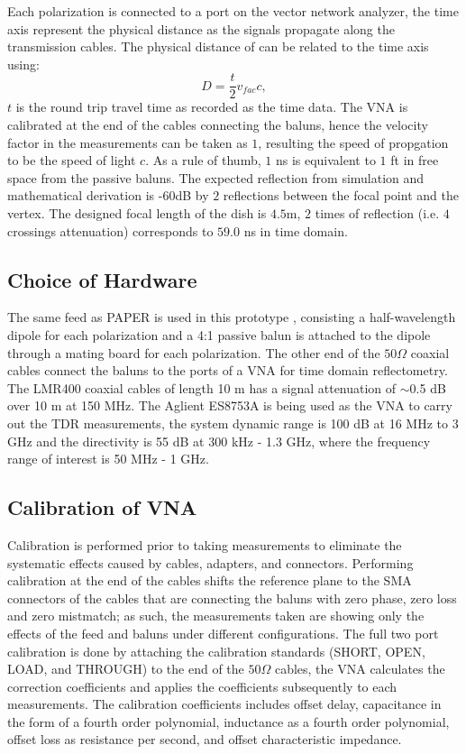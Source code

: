 \documentclass[preprint]{aastex}  %
\begin{document}
Each polarization is connected to a port on the vector network analyzer, the time axis represent the physical distance as the signals propagate along the transmission cables. The physical distance of can be related to the time axis using:
\begin{equation}
D = \frac{t}{2}v_{fac}c,
\end{equation}
$t$ is the round trip travel time as recorded as the time data.
The VNA is calibrated at the end of the cables connecting the baluns, hence the velocity factor in the measurements can be taken as $1$, resulting the speed of propgation to be the speed of light $c$. As a rule of thumb,  $1$ ns is equivalent to $1$ ft in free space from the passive baluns. The expected reflection from simulation and mathematical derivation is -$60$dB by $2$ reflections between the focal point and the vertex. The designed focal length of the dish is $4.5$m, $2$ times of reflection (i.e. $4$ crossings attenuation) corresponds to $59.0$ ns in time domain.
\subsection{Choice of Hardware}
The same feed as PAPER is used in this prototype , consisting a half-wavelength dipole for each polarization and a 4:1 passive balun is attached to the dipole through a mating board for each polarization. The other end of the $50\Omega$ coaxial cables connect the baluns to the ports of a VNA for time domain reflectometry. The LMR400 coaxial cables of length 10 m has a signal attenuation of $\sim$0.5 dB over 10 m at 150 MHz. The Aglient ES8753A is being used as the VNA to carry out the TDR measurements, the system dynamic range is 100 dB at 16 MHz to 3 GHz and the directivity is 55 dB at 300 kHz - 1.3 GHz, where the frequency range of interest is 50 MHz - 1 GHz. 

\subsection{Calibration of VNA}
Calibration is performed prior to taking measurements to eliminate the systematic effects caused by cables, adapters, and connectors. Performing calibration at the end of the cables shifts the reference plane to the SMA connectors of the cables that are connecting the baluns with zero phase, zero loss and zero mistmatch; as such, the measurements taken are showing only the effects of the feed and baluns under different configurations. The full two port calibration is done by attaching the calibration standards (SHORT, OPEN, LOAD, and THROUGH) to the end of the $50\Omega$ cables, the VNA calculates the correction coefficients and applies the coefficients subsequently to each measurements. The calibration coefficients includes offset delay, capacitance in the form of a fourth order polynomial, inductance as a fourth order polynomial, offset loss as resistance per second, and offset characteristic impedance. 
\end{document}
